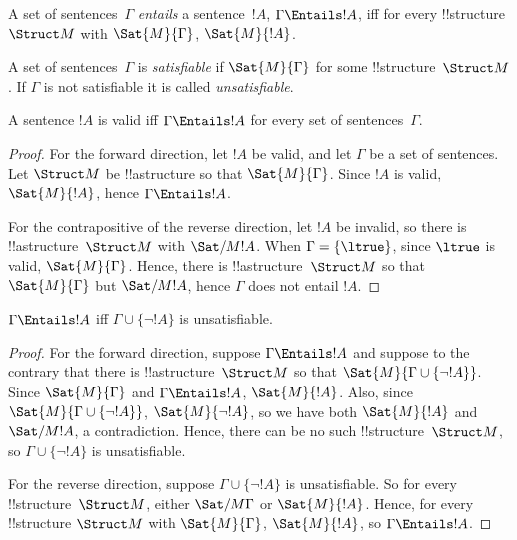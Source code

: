 \begin{defn}[Entailment]
A set of sentences~$\Gamma$ \emph{entails} a sentence~$!A$, $\Gamma
\Entails !A$, iff for every !!{structure}~$\Struct M$ with
$\Sat{M}{\Gamma}$, $\Sat{M}{!A}$.
\end{defn}


\begin{defn}[Satisfiability]
A set of sentences~$\Gamma$ is \emph{satisfiable} if $\Sat{M}{\Gamma}$
for some !!{structure}~$\Struct M$.  If $\Gamma$ is not satisfiable it is
called \emph{unsatisfiable}.
\end{defn}

\begin{prop}
A sentence $!A$ is valid iff $\Gamma \Entails !A$ for every set of
sentences~$\Gamma$.
\end{prop}

\begin{proof}
For the forward direction, let $!A$ be valid, and let $\Gamma$ be a
set of sentences. Let $\Struct M$ be !!a{structure} so that
$\Sat{M}{\Gamma}$. Since $!A$ is valid, $\Sat{M}{!A}$, hence $\Gamma
\Entails !A$.

For the contrapositive of the reverse direction, let $!A$ be invalid,
so there is !!a{structure}~$\Struct M$ with $\Sat/{M}{!A}$. When $\Gamma
= \{ \ltrue \}$, since $\ltrue$ is valid, $\Sat{M}{\Gamma}$. Hence,
there is !!a{structure}~$\Struct M$ so that $\Sat{M}{\Gamma}$ but
$\Sat/{M}{!A}$, hence $\Gamma$ does not entail $!A$.
\end{proof}

\begin{prop}
$\Gamma \Entails !A$ iff $\Gamma \cup \{\lnot !A\}$ is unsatisfiable.
\end{prop}

\begin{proof}
For the forward direction, suppose $\Gamma \Entails !A$ and suppose to the
contrary that there is !!a{structure}~$\Struct M$ so that $\Sat{M}{\Gamma
  \cup \{ \lnot !A \}}$. Since $\Sat{M}{\Gamma}$ and $\Gamma \Entails
!A$, $\Sat{M}{!A}$. Also, since $\Sat{M}{\Gamma\cup \{ \lnot !A \}}$,
$\Sat{M}{\lnot !A}$, so we have both $\Sat{M}{!A}$ and $\Sat/{M}{!A}$,
a contradiction. Hence, there can be no such !!{structure}~$\Struct M$, so
$\Gamma \cup \{ \lnot !A \}$ is unsatisfiable.

For the reverse direction, suppose $\Gamma \cup \{ \lnot !A \}$ is
unsatisfiable. So for every !!{structure}~$\Struct M$, either
$\Sat/{M}{\Gamma}$ or $\Sat{M}{!A}$. Hence, for every !!{structure}
$\Struct M$ with $\Sat{M}{\Gamma}$, $\Sat{M}{!A}$, so $\Gamma \Entails
!A$.
\end{proof}


